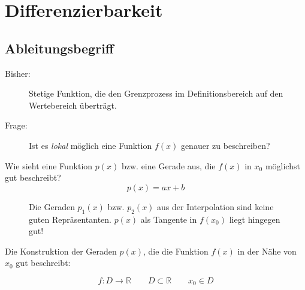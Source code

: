 \newpage
{}
\section{Differenzierbarkeit}
\subsection{Ableitungsbegriff}

\begin{description}
	\item[Bisher:]Stetige Funktion, die den Grenzprozess im Definitionsbereich auf den Wertebereich überträgt.
	\item[Frage:]Ist es \emph{lokal} möglich eine Funktion \( f(x) \) genauer zu beschreiben? 
\end{description}

\noindent Wie sieht eine Funktion \( p(x) \) bzw. eine Gerade aus, die \( f(x) \) in \( x_0 \) möglichst gut beschreibt?
\[
p(x)=ax+b 
\]
\begin{figure}[h]
	\begin{center}
\end{center}
\caption{Die Geraden \( p_1(x) \) bzw. \( p_2(x) \) aus der Interpolation sind keine guten Repräsentanten. \(p(x)\) als Tangente in \(f(x_0)\) liegt hingegen gut!}
\label{Approximierung}
\end{figure}


\noindent Die Konstruktion der Geraden \( p(x) \), die die Funktion \( f(x) \) in der Nähe von \( x_0 \) gut beschreibt:

\[
	f:D\rightarrow\mathbb{R} \qquad D\subset\mathbb{R} \qquad x_0 \in D
\]

